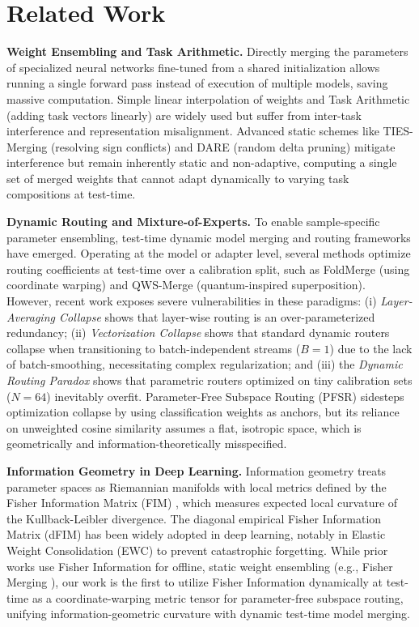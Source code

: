 \section{Related Work}
\label{sec:related_work}

\textbf{Weight Ensembling and Task Arithmetic.} 
Directly merging the parameters of specialized neural networks fine-tuned from a shared initialization allows running a single forward pass instead of execution of multiple models, saving massive computation. Simple linear interpolation of weights \cite{wortsman2022model} and Task Arithmetic \cite{ilharco2022editing} (adding task vectors linearly) are widely used but suffer from inter-task interference and representation misalignment. Advanced static schemes like TIES-Merging \cite{yadav2023ties} (resolving sign conflicts) and DARE \cite{yu2023language} (random delta pruning) mitigate interference but remain inherently static and non-adaptive, computing a single set of merged weights that cannot adapt dynamically to varying task compositions at test-time.

\textbf{Dynamic Routing and Mixture-of-Experts.} 
To enable sample-specific parameter ensembling, test-time dynamic model merging and routing frameworks have emerged. Operating at the model or adapter level, several methods optimize routing coefficients at test-time over a calibration split, such as FoldMerge \cite{coordinatewarping} (using coordinate warping) and QWS-Merge \cite{qws2025} (quantum-inspired superposition). However, recent work exposes severe vulnerabilities in these paradigms: (i) \emph{Layer-Averaging Collapse} \cite{l3collapse} shows that layer-wise routing is an over-parameterized redundancy; (ii) \emph{Vectorization Collapse} \cite{priorclassical} shows that standard dynamic routers collapse when transitioning to batch-independent streams ($B=1$) due to the lack of batch-smoothing, necessitating complex regularization; and (iii) the \emph{Dynamic Routing Paradox} shows that parametric routers optimized on tiny calibration sets ($N=64$) inevitably overfit. Parameter-Free Subspace Routing (PFSR) \cite{pfsr2026} sidesteps optimization collapse by using classification weights as anchors, but its reliance on unweighted cosine similarity assumes a flat, isotropic space, which is geometrically and information-theoretically misspecified.

\textbf{Information Geometry in Deep Learning.} 
Information geometry treats parameter spaces as Riemannian manifolds with local metrics defined by the Fisher Information Matrix (FIM) \cite{amari1998natural}, which measures expected local curvature of the Kullback-Leibler divergence. The diagonal empirical Fisher Information Matrix (dFIM) has been widely adopted in deep learning, notably in Elastic Weight Consolidation (EWC) \cite{kirkpatrick2017overcoming} to prevent catastrophic forgetting. While prior works use Fisher Information for offline, static weight ensembling (e.g., Fisher Merging \cite{matena2021merging}), our work is the first to utilize Fisher Information dynamically at test-time as a coordinate-warping metric tensor for parameter-free subspace routing, unifying information-geometric curvature with dynamic test-time model merging.
